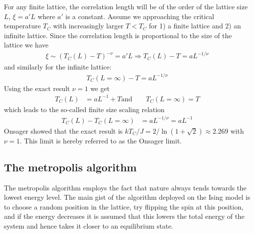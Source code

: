 \documentclass[twoside, 11pt]{article}
\begin{document}
		For any finite lattice, the correlation length will be of the order of the lattice size $L$, $\xi = a'L$ where $a'$ is a constant. Assume we approaching the critical temperature $T_C$ with increasingly larger $T<T_C$ for 1) a finite lattice and 2) an infinite lattice. Since the correlation length is proportional to the size of the lattice we have
		\begin{align*}
			\xi \sim (T_C(L) - T)^{-\nu} = a'L \Rightarrow T_C(L) - T = aL^{-1/\nu}
		\end{align*}
		and similarly for the infinite lattice:
		\begin{align*}
			T_C(L=\infty) - T = aL^{-1/\nu} 
		\end{align*}
		Using the exact result $\nu = 1$ we get
		\begin{align*}
			T_C(L) &= aL^{-1} + T
			\mathrm{and} \qquad T_C(L=\infty) = T
		\end{align*}
		which leads to the so-called finite size scaling relation
		\begin{align}
			T_C(L) - T_C(L = \infty) &= aL^{-1/\nu} = aL^{-1} \label{eq: finite size scaling}
		\end{align}
%		
		Onsager showed that the exact result is $kT_C/J = 2/\ln(1+\sqrt{2}) \approx 2.269$ with $\nu=1$. This limit is hereby referred to as the Onsager limit.

	
	\subsection{The metropolis algorithm}
		The metropolis algorithm employs the fact that nature always tends towards the lowest energy level. The main gist of the algorithm deployed on the Ising model is to choose a random position in the lattice, try flipping the spin at this position, and if the energy decreases it is assumed that this lowers the total energy of the system and hence takes it closer to an equilibrium state. 
		
\end{document}
